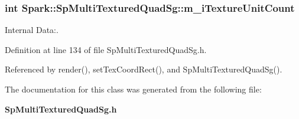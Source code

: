 \subsubsection{\setlength{\rightskip}{0pt plus 5cm}int {\bf Spark::Sp\-Multi\-Textured\-Quad\-Sg::m\_\-i\-Texture\-Unit\-Count}\hspace{0.3cm}{\tt  [protected]}}\label{classSpark_1_1SpMultiTexturedQuadSg_p0}


Internal Data:. 

Definition at line 134 of file Sp\-Multi\-Textured\-Quad\-Sg.h.

Referenced by render(), set\-Tex\-Coord\-Rect(), and Sp\-Multi\-Textured\-Quad\-Sg().

The documentation for this class was generated from the following file:\begin{CompactItemize}
\item 
{\bf Sp\-Multi\-Textured\-Quad\-Sg.h}\end{CompactItemize}
